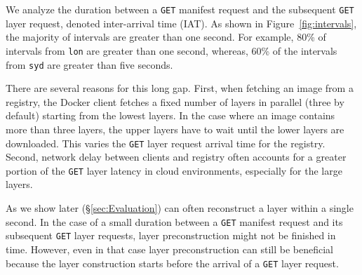 \label{sec:layer-preconstruction}
%
%
%
%
%
We analyze the duration between a \texttt{GET} manifest request and the subsequent
\texttt{GET} layer request, denoted inter-arrival time (IAT).
%
As shown in Figure~\ref{fig:intervals}, the majority of intervals are greater than one second.
%
For example, 80\% of intervals from \texttt{lon} are greater than one second,
whereas, 60\% of the intervals from \texttt{syd} are greater than five seconds. 
%

There are several reasons for this long gap.
%
First, when fetching an image from a registry,
the Docker client fetches a fixed number of layers in parallel (three by
default) starting from the lowest layers.
%
In the case where an image
contains more than three layers, the upper layers have to wait until the
lower layers are downloaded.
%
This varies the \texttt{GET} layer request arrival time for the registry.
%
Second, network delay between clients and registry
often accounts for a greater portion of the \texttt{GET} layer latency in cloud
environments, especially for the large layers.
%

As we show later (\S\ref{sec:Evaluation}) \sysname
can often reconstruct a layer within a single second.
%
In the case of a small duration between a \texttt{GET} manifest request and its subsequent \texttt{GET} layer requests,
layer preconstruction might not be finished in time. However, even in that case layer preconstruction can still be beneficial because
the layer construction starts before the arrival of a \texttt{GET} layer request.



